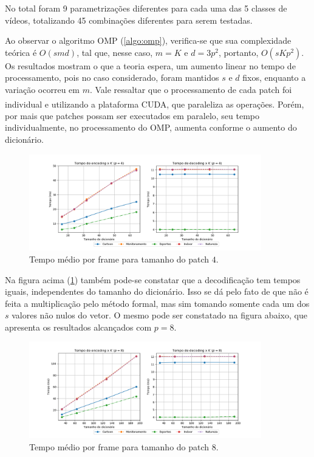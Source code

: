 \documentclass[cic,tc]{iiufrgs}
\newcommand{\reg}{\textsuperscript{\textregistered}}
\begin{document}
No total foram 9 parametrizações diferentes para cada uma das 5 classes de vídeos, 
totalizando 45 combinações diferentes para serem testadas.

Ao observar o algoritmo OMP (\ref{algo:omp}), verifica-se que sua complexidade teórica 
é $O(s m d)$, tal que, nesse caso, $m = K$ e $d = 3p^2$, portanto, $O(s K p^2)$.
Os resultados mostram o que a teoria espera, um aumento linear no tempo de processamento,
pois no caso considerado, foram mantidos $s$ e $d$ fixos, enquanto a variação ocorreu em $m$.
Vale ressaltar que o processamento de cada patch foi individual e utilizando a plataforma 
CUDA\reg, que paraleliza as operações.
Porém, por mais que patches possam ser executados em paralelo, seu tempo individualmente, 
no processamento do OMP, aumenta conforme o aumento do dicionário.

\begin{figure}[H]
    \caption{Tempo médio por frame para tamanho do patch $4$.}
    \begin{center}
        \includegraphics[width=0.9\textwidth]{img/graficos/p4_ds_edtime.png}
    \end{center}
    \label{fig:timep4}
\end{figure}

Na figura acima (\ref{fig:timep4}) também pode-se constatar que a decodificação tem tempos iguais, independentes
do tamanho do dicionário.
Isso se dá pelo fato de que não é feita a multiplicação pelo método formal, mas sim tomando
somente cada um dos $s$ valores não nulos do vetor.
O mesmo pode ser constatado na figura abaixo, que apresenta os resultados alcançados com $p=8$.

\begin{figure}[H]
    \caption{Tempo médio por frame para tamanho do patch $8$.}
    \begin{center}
        \includegraphics[width=0.9\textwidth]{img/graficos/p8_ds_edtime.png}
    \end{center}
    \label{fig:timep8}
\end{figure}
\end{document}
